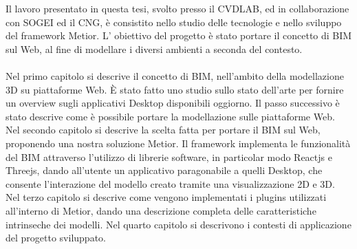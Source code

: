 
Il lavoro presentato in questa tesi, svolto presso il CVDLAB, ed in collaborazione con SOGEI ed il CNG,
 \`e consistito nello studio delle tecnologie e nello sviluppo del framework Metior. L' obiettivo del progetto
 \`e stato portare il concetto di BIM sul Web, al fine di modellare i diversi ambienti a seconda del contesto.\\
\\
Nel primo capitolo si descrive il concetto di BIM,
nell'ambito della modellazione 3D su piattaforme Web. \`E stato fatto uno studio sullo stato dell'arte
per fornire un overview sugli applicativi Desktop disponibili oggiorno.
Il passo successivo \`e stato descrive come \`e possibile portare la modellazione sulle piattaforme Web.
Nel secondo capitolo si descrive la scelta fatta per portare il BIM sul Web, proponendo una nostra soluzione Metior.
Il framework implementa le funzionalit\`a del BIM attraverso l'utilizzo di librerie software,
in particolar modo Reactjs e Threejs, dando all'utente un applicativo paragonabile a quelli
Desktop, che consente l'interazione del modello creato tramite una visualizzazione 2D e 3D.
Nel terzo capitolo si descrive come vengono implementati i plugins utilizzati all'interno di Metior,
dando una descrizione completa delle caratteristiche intrinseche dei modelli.
Nel quarto capitolo si descrivono i contesti di applicazione del progetto sviluppato.
